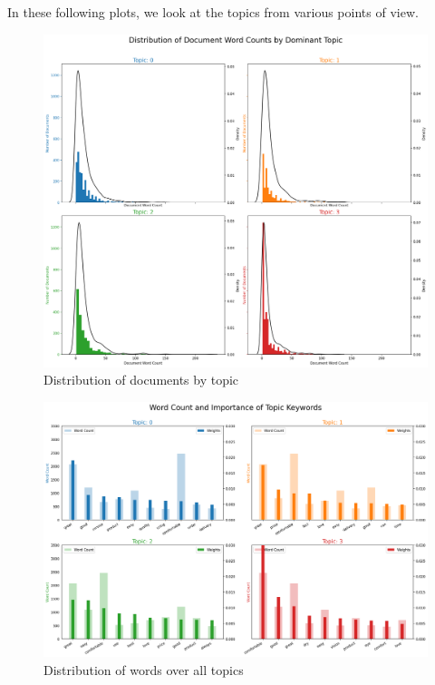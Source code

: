 \documentclass[11pt, letterpaper]{article}
\begin{document}
In these following plots, we look at the topics from various points of view.
\begin{figure}[H]%
         \includegraphics[width=\textwidth]{doc_distribution_by_topic.png}
         \caption{Distribution of documents by topic}
         \label{fig:by_doc_topic}
\end{figure}

\begin{figure}[H]
         \includegraphics[width=\textwidth]{word_importance_topic.png}
         \caption{Distribution of words over all topics}
         \label{fig:by_word_topic}
     \end{figure}
\end{document}
